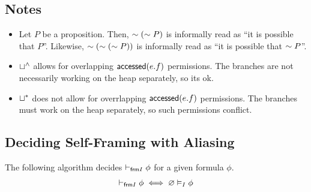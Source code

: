 \subsection{Notes}

\begin{itemize}
  \item
  Let $P$ be a proposition.
  Then, $\pnot (\pnot P)$ is informally read as ``it is possible that $P$''.
  Likewise, $\pnot (\pnot (\pnot P))$ is informally read as ``it is possible that $\pnot P$''.

  \item $\merge^\land$ allows for overlapping $\accessed(e.f)$ permissions. The branches are not necessarily working on the heap separately, so its ok.

  \item $\merge^\ast$ does not allow for overrlapping $\accessed(e.f)$ permissions. The branches must work on the heap separately, so such permissions conflict.
\end{itemize}

\subsection{Deciding Self-Framing with Aliasing}

\noindent
The following algorithm decides $\selfframes \phi$ for a given formula $\phi$.
\begin{align*}
\selfframes \phi \iff \empty \frames \phi
\end{align*}
